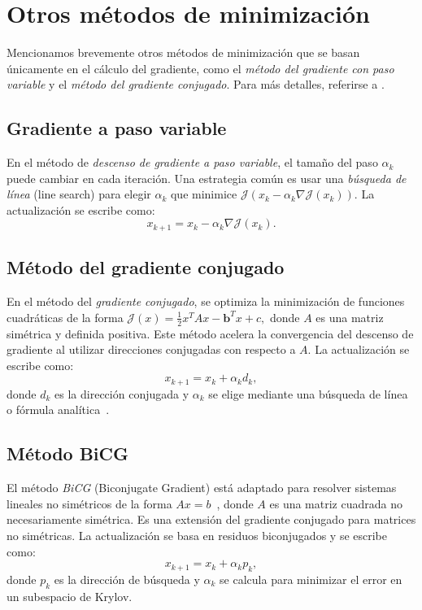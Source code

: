 \documentclass[12pt]{book}
\theoremstyle{definition}
\theoremstyle{plain}
\theoremstyle{remark}
\begin{document}
\section{Otros métodos de minimización}

Mencionamos brevemente otros métodos de minimización que se basan únicamente en el cálculo del gradiente, como el \emph{método del gradiente con paso variable} y el \emph{método del gradiente conjugado}. Para m\'as detalles, referirse a \cite{allaire2007,ggk}.

\subsection{Gradiente a paso variable}

En el método de \emph{descenso de gradiente a paso variable}, el tamaño del paso $\alpha_k$ puede cambiar en cada iteración. Una estrategia común es usar una \emph{búsqueda de línea} (line search) para elegir $\alpha_k$ que minimice $\mathcal{J}({x}_k - \alpha_k \nabla \mathcal{J}({x}_k))$.
%
La actualización se escribe como:
%
$$
{x}_{k+1} = {x}_k - \alpha_k \nabla \mathcal{J}({x}_k).
$$

\subsection{Método del gradiente conjugado}

En el método del \emph{gradiente conjugado}, se optimiza la minimización de funciones cuadráticas de la forma
$
\mathcal{J}({x}) = \frac{1}{2} {x}^T A {x} - \mathbf{b}^T {x} + c,
$
donde $A$ es una matriz simétrica y definida positiva. Este método acelera la convergencia del descenso de gradiente al utilizar direcciones conjugadas con respecto a $A$.
%
La actualización se escribe como:
$$
{x}_{k+1} = {x}_k + \alpha_k {d}_k,
$$
donde ${d}_k$ es la dirección conjugada y $\alpha_k$ se elige mediante una búsqueda de línea o fórmula analítica~\cite{allairekaber2008,ggk}.

\subsection{Método BiCG}

El método \emph{BiCG} (Biconjugate Gradient) está adaptado para resolver sistemas lineales no simétricos de la forma $A{x} = {b}$~\cite[S. 11.7.8]{ggk}, donde $A$ es una matriz cuadrada no necesariamente simétrica. Es una extensión del gradiente conjugado para matrices no simétricas.
%
La actualización se basa en residuos biconjugados y se escribe como:
$$
{x}_{k+1} = {x}_k + \alpha_k {p}_k,
$$
donde ${p}_k$ es la dirección de búsqueda y $\alpha_k$ se calcula para minimizar el error en un subespacio de Krylov.
\end{document}
